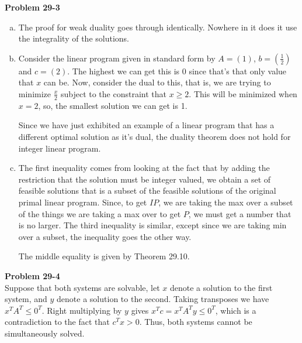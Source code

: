 \documentclass{article}
\begin{document}
\noindent\textbf{Problem 29-3}\\

\begin{enumerate}[a.]
\item The proof for weak duality goes through identically. Nowhere in it does it use the integrality of the solutions.
\item Consider the linear program given in standard form by $A = \left(1\right)$, $b = \left(\frac{1}{2}\right)$ and $c = \left( 2 \right)$. The highest we can get this is $0$ since that's that only value that $x$ can be. Now, consider the dual to this, that is, we are trying to minimize $\frac{x}{2}$ subject to the constraint that $x \ge 2$. This will be minimized when $x=2$, so, the smallest solution we can get is 1.

Since we have just exhibited an example of a linear program that has a different optimal solution as it's dual, the duality theorem does not hold for integer linear program.
\item
The first inequality comes from looking at the fact that by adding the restriction that the solution must be integer valued, we obtain a set of feasible solutions that is a subset of the feasible solutions of the original primal linear program. Since, to get $IP$, we are taking the max over a subset of the things we are taking a max over to get $P$, we must get a number that is no larger. The third inequality is similar, except since we are taking min over a subset, the inequality goes the other way.

The middle equality is given by Theorem 29.10.
\end{enumerate}

\noindent\textbf{Problem 29-4} \\

Suppose that both systems are solvable, let $x$ denote a solution to the first system, and $y$ denote a solution to the second. Taking transposes we have $x^TA^T \leq 0^T$.  Right multiplying by $y$ gives $x^Tc = x^TA^Ty \leq 0^T$, which is a contradiction to the fact that $c^Tx > 0$.  Thus, both systems cannot be simultaneously solved.\\

\end{document}
